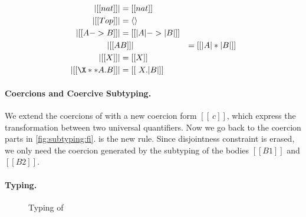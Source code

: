 \begin{definition} \label{def:type:translate:fi}
  \begin{align*}
    | [[nat]] | &= [[nat]] \\
    | [[Top]] | &= \langle \rangle \\
    | [[A -> B]]  | &= [[ | A | -> | B |  ]] \\
    | [[ A & B  ]] | &= [[ | A | * | B |  ]] \\
    | [[ X  ]] | &= [[ X ]] \\
    | [[ \X ** A . B ]] | &= [[ \ X . | B | ]]
  \end{align*}
\end{definition}


\paragraph{Coercions and Coercive Subtyping.}

We extend the coercions of \tname with a new coercion form $[[ \ c ]]$, which express the transformation between two universal
quantifiers. Now we go back to the coercion parts in \cref{fig:subtyping:fi}.
 is the new rule. Since disjointness constraint is erased, we
only need the coercion generated by the subtyping of the bodies $[[B1]]$ and $[[B2]]$.


\paragraph{\tnamee Typing.}


\begin{figure}
  \centering
  \caption{Typing of \tnamee}
\end{figure}


